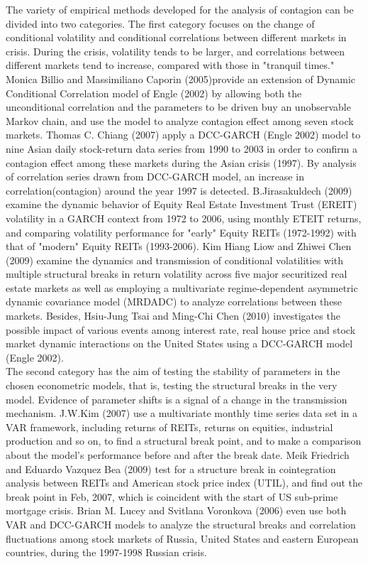 \documentclass[a4paper,12pt]{article}
\begin{document}
\noindent The variety of empirical methods developed for the analysis of contagion can be divided into two categories. The first category focuses on the change of conditional volatility and conditional correlations between different markets in crisis. During the crisis, volatility tends to be larger, and correlations between different markets tend to increase, compared with those in "tranquil times." Monica Billio and Massimiliano Caporin (2005)provide an extension of Dynamic Conditional Correlation model of Engle (2002) by allowing both the unconditional correlation and the parameters to be driven buy an unobservable Markov chain, and use the model to analyze contagion effect among seven stock markets. Thomas C. Chiang (2007) apply a DCC-GARCH (Engle 2002) model to nine Asian daily stock-return data series from 1990 to 2003 in order to confirm a contagion effect among these markets during the Asian crisis (1997). By analysis of correlation series drawn from DCC-GARCH model, an increase in correlation(contagion) around the year 1997 is detected. B.Jirasakuldech (2009) examine the dynamic behavior of Equity Real Estate Investment Trust (EREIT) volatility in a GARCH context from 1972 to 2006, using monthly ETEIT returns, and comparing volatility performance for "early" Equity REITs (1972-1992) with that of "modern" Equity REITs (1993-2006). Kim Hiang Liow and Zhiwei Chen (2009) examine the dynamics and transmission of conditional volatilities with multiple structural breaks in return volatility across five major securitized real estate markets as well as employing a multivariate regime-dependent asymmetric dynamic covariance model (MRDADC) to analyze correlations between these markets. Besides, Hsiu-Jung Tsai and Ming-Chi Chen (2010) investigates the possible impact of various events among interest rate, real house price and stock market dynamic interactions on the United States using a DCC-GARCH model (Engle 2002).\\

\noindent The second category has the aim of testing the stability of parameters in the chosen econometric models, that is, testing the structural breaks in the very model. Evidence of parameter shifts is a signal of a change in the transmission mechanism. J.W.Kim (2007) use a multivariate monthly time series data set in a VAR framework, including returns of REITs, returns on equities, industrial production and so on, to find a structural break point, and to make a comparison about the model's performance before and after the break date. Meik Friedrich and Eduardo Vazquez Bea (2009) test for a structure break in cointegration analysis between REITs and American stock price index (UTIL), and find out the break point in Feb, 2007, which is coincident with the start of US sub-prime mortgage crisis. Brian M. Lucey and Svitlana Voronkova (2006) even use both VAR and DCC-GARCH models to analyze the structural breaks and correlation fluctuations among stock markets of Russia, United States and eastern European countries, during the 1997-1998 Russian crisis.\\
\end{document}
